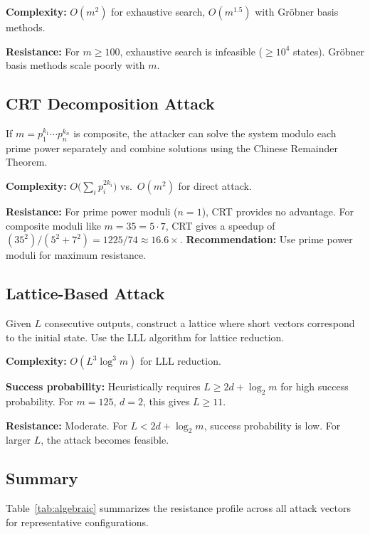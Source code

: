 \documentclass[11pt]{article}
\theoremstyle{plain}
\theoremstyle{definition}
\begin{document}
\textbf{Complexity:} $O(m^2)$ for exhaustive search, $O(m^{1.5})$ with Gr\"obner basis methods.

\textbf{Resistance:} For $m \geq 100$, exhaustive search is infeasible ($\geq 10^4$ states). Gr\"obner basis methods scale poorly with $m$.

\subsection{CRT Decomposition Attack}

If $m = p_1^{k_1} \cdots p_n^{k_n}$ is composite, the attacker can solve the system modulo each prime power separately and combine solutions using the Chinese Remainder Theorem.

\textbf{Complexity:} $O\bigl(\sum_i p_i^{2k_i}\bigr)$ vs.\ $O(m^2)$ for direct attack.

\textbf{Resistance:} For prime power moduli ($n=1$), CRT provides no advantage. For composite moduli like $m=35 = 5 \cdot 7$, CRT gives a speedup of $(35^2)/(5^2 + 7^2) = 1225/74 \approx 16.6\times$. \textbf{Recommendation:} Use prime power moduli for maximum resistance.

\subsection{Lattice-Based Attack}

Given $L$ consecutive outputs, construct a lattice where short vectors correspond to the initial state. Use the LLL algorithm for lattice reduction.

\textbf{Complexity:} $O(L^3 \log^3 m)$ for LLL reduction.

\textbf{Success probability:} Heuristically requires $L \geq 2d + \log_2 m$ for high success probability. For $m=125$, $d=2$, this gives $L \geq 11$.

\textbf{Resistance:} Moderate. For $L < 2d + \log_2 m$, success probability is low. For larger $L$, the attack becomes feasible.

\subsection{Summary}

Table~\ref{tab:algebraic} summarizes the resistance profile across all attack vectors for representative configurations.
\end{document}
